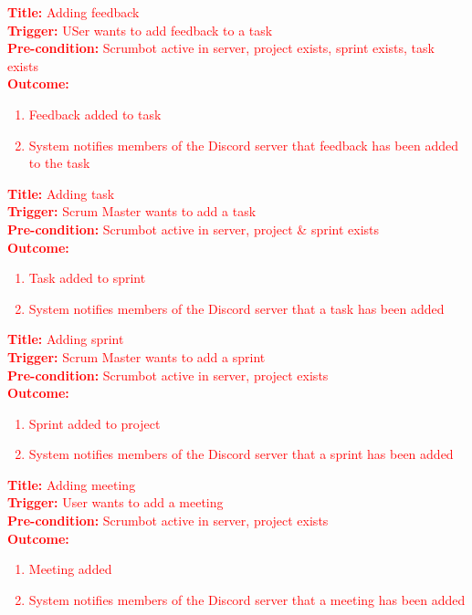 \documentclass[12pt, titlepage]{article}
\begin{document}
\noindent \textcolor{red}{\textbf{Title: }Adding feedback}\\
\textcolor{red}{\textbf{Trigger: }USer wants to add feedback to a task}\\
\textcolor{red}{\textbf{Pre-condition: }Scrumbot active in server, project exists, sprint exists, task exists}\\
\textcolor{red}{\textbf{Outcome: }}
\textcolor{red}{
\begin{enumerate}
    \item Feedback added to task
    \item System notifies members of the Discord server that feedback has been added to the task
\end{enumerate}
}

\noindent \textcolor{red}{\textbf{Title: }Adding task}\\
\textcolor{red}{\textbf{Trigger: }Scrum Master wants to add a task}\\
\textcolor{red}{\textbf{Pre-condition: }Scrumbot active in server, project \& sprint exists}\\
\textcolor{red}{\textbf{Outcome: }}
\textcolor{red}{
\begin{enumerate}
    \item Task added to sprint
    \item System notifies members of the Discord server that a task has been added
\end{enumerate}
}

\noindent \textcolor{red}{\textbf{Title: }Adding sprint}\\
\textcolor{red}{\textbf{Trigger: }Scrum Master wants to add a sprint}\\
\textcolor{red}{\textbf{Pre-condition: }Scrumbot active in server, project exists}\\
\textcolor{red}{\textbf{Outcome: }}
\textcolor{red}{
\begin{enumerate}
    \item Sprint added to project
    \item System notifies members of the Discord server that a sprint has been added
\end{enumerate}
}

\noindent \textcolor{red}{\textbf{Title: }Adding meeting}\\
\textcolor{red}{\textbf{Trigger: }User wants to add a meeting}\\
\textcolor{red}{\textbf{Pre-condition: }Scrumbot active in server, project exists}\\
\textcolor{red}{\textbf{Outcome: }}
\textcolor{red}{
\begin{enumerate}
    \item Meeting added
    \item System notifies members of the Discord server that a meeting has been added
\end{enumerate}
}
\end{document}
